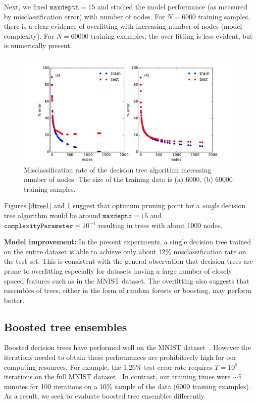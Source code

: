 \documentclass[10pt,letterpaper]{article}
\begin{document}
Next, we fixed $\texttt{maxdepth} = 15$ and studied the model performance (as measured by misclassification error) with number of nodes. For $N=6000$ training samples, there is a clear evidence of overfitting with increasing number of nodes (model complexity). For $N=60000$ training examples, the over fitting is less evident, but is numerically present. 

\begin{figure}[tbp]
	\begin{center}
	\includegraphics[width=5in]{../results/mnist/dtree/error_vs_nodes.pdf}
	\end{center}
	\caption{Misclassification rate of the decision tree algorithm increasing number of nodes. The size of the training data is (a) 6000, (b) 60000 training samples.\label{dtree2}}
\end{figure}

Figures \ref{dtree1} and \ref{dtree2} suggest that optimum pruning point for a {\em single} decision tree algorithm would be around $\texttt{maxdepth}=15$ and $\texttt{complexityParameter}=10^{-4}$ resulting in trees with about 1000 nodes. 

{\bf Model improvement:} In the present experiments, a single decision tree trained on the entire dataset is able to achieve only about 12\% misclassification rate on the test set. This is consistent with the general observation that decision trees are prone to overfitting especially for datasets having a large number of closely spaced features such as in the MNIST dataset. The overfitting also suggests that ensembles of trees, either in the form of random forests or boosting, may perform better. 
\subsection{Boosted tree ensembles}
Boosted decision trees have performed well on the MNIST dataset~\cite{kegl}. However the iterations needed to obtain these performances are prohibitively high for our computing resources. For example, the 1.26\% test error rate requires $T = 10^5$ iterations on the full MNIST dataset \cite{kegl}. In contrast, our training times were $\sim$5 minutes for 100 iterations on a 10\% sample of the data (6000 training examples). As a result, we seek to evaluate boosted tree ensembles differently.
\end{document}
